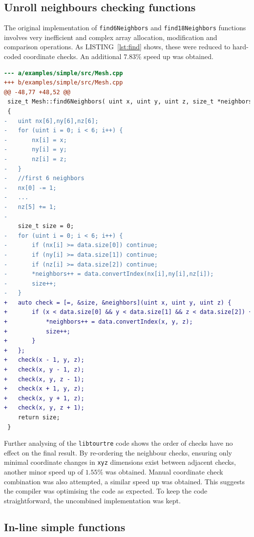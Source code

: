 \documentclass[conference]{IEEEtran}
\newcommand{\lref}[1]{LISTING~\ref{#1}}
\begin{document}
\subsection{Unroll neighbours checking functions} \label{sec:check}

The original implementation of \texttt{find6Neighbors} and \texttt{find18Neighbors} functions involves very inefficient and complex array allocation, modification and comparison operations. As \lref{lst:find} shows, these were reduced to hard-coded coordinate checks. An additional $7.83 \%$ speed up was obtained.

\begin{lstlisting}[language=diff,label=lst:find,caption={\texttt{find6Neighbours} code modification},captionpos=b,float,floatplacement=t]
--- a/examples/simple/src/Mesh.cpp
+++ b/examples/simple/src/Mesh.cpp
@@ -48,77 +48,52 @@
 size_t Mesh::find6Neighbors( uint x, uint y, uint z, size_t *neighbors)
 {
-   uint nx[6],ny[6],nz[6];
-   for (uint i = 0; i < 6; i++) {
-       nx[i] = x;
-       ny[i] = y;
-       nz[i] = z;
-   }
-   //first 6 neighbors
-   nx[0] -= 1;
-   ...
-   nz[5] += 1;
-
    size_t size = 0;
-   for (uint i = 0; i < 6; i++) {
-       if (nx[i] >= data.size[0]) continue;
-       if (ny[i] >= data.size[1]) continue;
-       if (nz[i] >= data.size[2]) continue;
-       *neighbors++ = data.convertIndex(nx[i],ny[i],nz[i]);
-       size++;
-   }
+   auto check = [=, &size, &neighbors](uint x, uint y, uint z) {
+       if (x < data.size[0] && y < data.size[1] && z < data.size[2]) {
+           *neighbors++ = data.convertIndex(x, y, z);
+           size++;
+       }
+   };
+   check(x - 1, y, z);
+   check(x, y - 1, z);
+   check(x, y, z - 1);
+   check(x + 1, y, z);
+   check(x, y + 1, z);
+   check(x, y, z + 1);
    return size;
 }
\end{lstlisting}

Further analysing of the \texttt{libtourtre} code shows the order of checks have no effect on the final result. By re-ordering the neighbour checks, ensuring only minimal coordinate changes in \texttt{xyz} dimensions exist between adjacent checks, another minor speed up of $1.55 \%$ was obtained. Manual coordinate check combination was also attempted, a similar speed up was obtained. This suggests the compiler was optimising the code as expected. To keep the code straightforward, the uncombined implementation was kept.

\subsection{In-line simple functions} \label{sec:inline}
\end{document}

